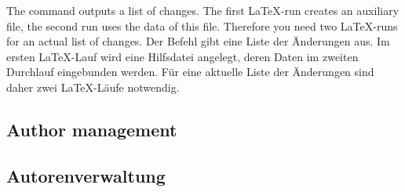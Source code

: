 \subsubsection{}
\DescribeMacro{\listofchanges}
\ifENGLISH
The command  outputs a list of changes.
The first \LaTeX-run creates an auxiliary file, the second run uses the data of this file.
Therefore you need two \LaTeX-runs for an actual list of changes.
\fi
\ifGERMAN
	Der Befehl  gibt eine Liste der Änderungen aus.
	Im ersten \LaTeX-Lauf wird eine Hilfsdatei angelegt, deren Daten im zweiten Durchlauf eingebunden werden.
	Für eine aktuelle Liste der Änderungen sind daher zwei \LaTeX-Läufe notwendig.
\fi
\begin{chusage}
\>
\end{chusage}

\ifENGLISH
\subsection{Author management}
\fi
\ifGERMAN
	\subsection{Autorenverwaltung}
\fi


